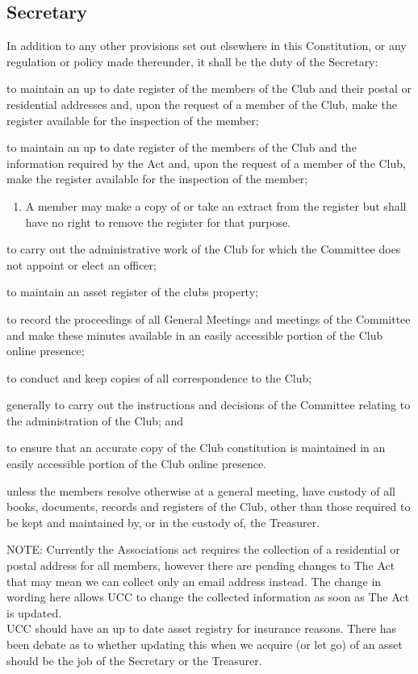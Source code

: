 \documentclass[11pt]{article} %
\begin{document}
\subsection{Secretary}
In addition to any other provisions set out elsewhere in this Constitution, or any regulation or policy made thereunder, it shall be the duty of the Secretary:
\begin{enumerate}

	{\color{red} \item to maintain an up to date register of the members of the Club and their postal or residential addresses and, upon the request of a member of the Club, make the register available for the inspection of the member;}
	{\color{ForestGreen} \item to maintain an up to date register of the members of the Club and the information required by the Act and, upon the request of a member of the Club, make the register available for the inspection of the member;}
	\begin{enumerate}[1.]
			\item A member may make a copy of or take an extract from the register but shall have no right to remove the register for that purpose.
		\end{enumerate}
	\item to carry out the administrative work of the Club for which the Committee does not appoint or elect an officer;
	{\color{ForestGreen}\item to maintain an asset register of the clubs property;}
	\item to record the proceedings of all General Meetings and meetings of the Committee and make these minutes available in an easily accessible portion of the Club online presence;
	\item to conduct and keep copies of all correspondence to the Club;
	\item generally to carry out the instructions and decisions of the Committee relating to the administration of the Club; and
	\item to ensure that an accurate copy of the Club constitution is maintained in an easily accessible portion of the Club online presence.
	\item unless the members resolve otherwise at a general meeting, have custody of all books, documents, records and registers of the Club, other than those required to be kept and maintained by, or in the custody of, the Treasurer.
\end{enumerate}
{\color{Cyan}NOTE:
Currently the Associations act requires the collection of a residential or postal address for all members, however there are pending changes to The Act that may mean we can collect only an email address instead.
The change in wording here allows UCC to change the collected information as soon as The Act is updated.\\
UCC should have an up to date asset registry for insurance reasons. There has been debate as to whether updating this when we acquire (or let go) of an asset should be the job of the Secretary or the Treasurer.
}
\end{document}
